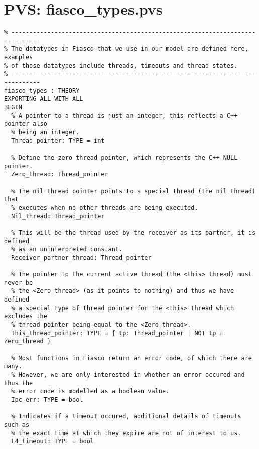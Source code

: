 \hypertarget{pvs_fiasco_types}{\chapter{PVS: fiasco\_types.pvs}}
\lstset{language=PVS}
\begin{lstlisting}
% ------------------------------------------------------------------------------
% The datatypes in Fiasco that we use in our model are defined here, examples
% of those datatypes include threads, timeouts and thread states.
% ------------------------------------------------------------------------------
fiasco_types : THEORY
EXPORTING ALL WITH ALL
BEGIN
  % A pointer to a thread is just an integer, this reflects a C++ pointer also
  % being an integer.
  Thread_pointer: TYPE = int

  % Define the zero thread pointer, which represents the C++ NULL pointer.
  Zero_thread: Thread_pointer

  % The nil thread pointer points to a special thread (the nil thread) that
  % executes when no other threads are being executed.
  Nil_thread: Thread_pointer

  % This will be the thread used by the receiver as its partner, it is defined
  % as an uninterpreted constant.
  Receiver_partner_thread: Thread_pointer

  % The pointer to the current active thread (the <this> thread) must never be
  % the <Zero_thread> (as it points to nothing) and thus we have defined
  % a special type of thread pointer for the <this> thread which excludes the
  % thread pointer being equal to the <Zero_thread>.
  This_thread_pointer: TYPE = { tp: Thread_pointer | NOT tp = Zero_thread }

  % Most functions in Fiasco return an error code, of which there are many.
  % However, we are only interested in whether an error occured and thus the
  % error code is modelled as a boolean value.
  Ipc_err: TYPE = bool

  % Indicates if a timeout occured, additional details of timeouts such as 
  % the exact time at which they expire are not of interest to us.
  L4_timeout: TYPE = bool


\end{lstlisting}
